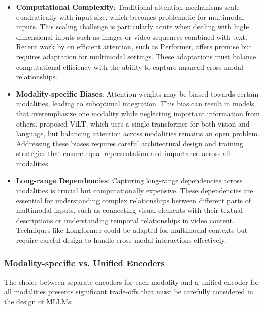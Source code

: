 \begin{itemize}
    \item \textbf{Computational Complexity}: Traditional attention mechanisms scale quadratically with input size, which becomes problematic for multimodal inputs. This scaling challenge is particularly acute when dealing with high-dimensional inputs such as images or video sequences combined with text. Recent work by \citet{choromanski2021rethinking} on efficient attention, such as Performer, offers promise but requires adaptation for multimodal settings. These adaptations must balance computational efficiency with the ability to capture nuanced cross-modal relationships.
    
    \item \textbf{Modality-specific Biases}: Attention weights may be biased towards certain modalities, leading to suboptimal integration. This bias can result in models that overemphasize one modality while neglecting important information from others. \citet{kim2021vilt} proposed ViLT, which uses a single transformer for both vision and language, but balancing attention across modalities remains an open problem. Addressing these biases requires careful architectural design and training strategies that ensure equal representation and importance across all modalities.
    
    \item \textbf{Long-range Dependencies}: Capturing long-range dependencies across modalities is crucial but computationally expensive. These dependencies are essential for understanding complex relationships between different parts of multimodal inputs, such as connecting visual elements with their textual descriptions or understanding temporal relationships in video content. Techniques like Longformer \citep{beltagy2020longformer} could be adapted for multimodal contexts but require careful design to handle cross-modal interactions effectively.
\end{itemize}

\subsubsection{Modality-specific vs. Unified Encoders}
The choice between separate encoders for each modality and a unified encoder for all modalities presents significant trade-offs that must be carefully considered in the design of MLLMs:

